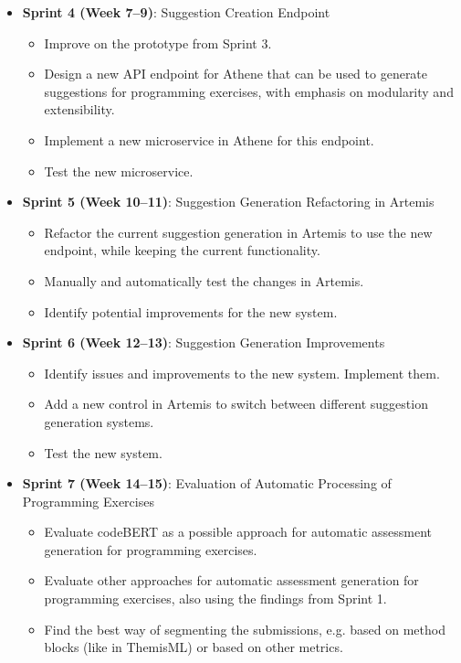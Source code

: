 \begin{itemize}
\begin{itemize}
    \end{itemize}
    \item \textbf{Sprint 4 (Week 7--9)}: Suggestion Creation Endpoint
    \begin{itemize}
        \item Improve on the prototype from Sprint 3.
        \item Design a new API endpoint for Athene that can be used to generate suggestions for programming exercises, with emphasis on modularity and extensibility.
        \item Implement a new microservice in Athene for this endpoint.
        \item Test the new microservice.
    \end{itemize}
    \item \textbf{Sprint 5 (Week 10--11)}: Suggestion Generation Refactoring in Artemis
    \begin{itemize}
        \item Refactor the current suggestion generation in Artemis to use the new endpoint, while keeping the current functionality.
        \item Manually and automatically test the changes in Artemis.
        \item Identify potential improvements for the new system.
    \end{itemize}
    \item \textbf{Sprint 6 (Week 12--13)}: Suggestion Generation Improvements
    \begin{itemize}
        \item Identify issues and improvements to the new system. Implement them.
        \item Add a new control in Artemis to switch between different suggestion generation systems.
        \item Test the new system.
    \end{itemize}
    \item \textbf{Sprint 7 (Week 14--15)}: Evaluation of Automatic Processing of Programming Exercises
    \begin{itemize}
        \item Evaluate codeBERT as a possible approach for automatic assessment generation for programming exercises.
        \item Evaluate other approaches for automatic assessment generation for programming exercises, also using the findings from Sprint 1.
        \item Find the best way of segmenting the submissions, e.g. based on method blocks (like in ThemisML) or based on other metrics.

\end{itemize}
\end{itemize}
